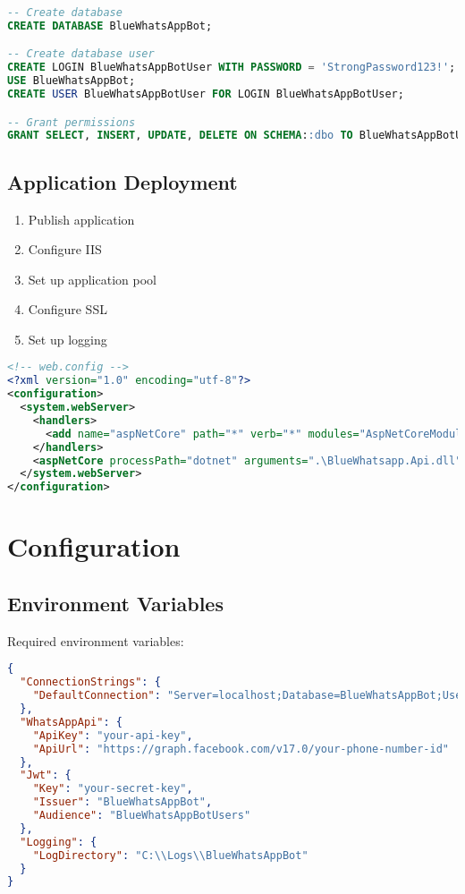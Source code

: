 \begin{lstlisting}[language=sql]
-- Create database
CREATE DATABASE BlueWhatsAppBot;

-- Create database user
CREATE LOGIN BlueWhatsAppBotUser WITH PASSWORD = 'StrongPassword123!';
USE BlueWhatsAppBot;
CREATE USER BlueWhatsAppBotUser FOR LOGIN BlueWhatsAppBotUser;

-- Grant permissions
GRANT SELECT, INSERT, UPDATE, DELETE ON SCHEMA::dbo TO BlueWhatsAppBotUser;
\end{lstlisting}

\subsection{Application Deployment}
\begin{enumerate}
    \item Publish application
    \item Configure IIS
    \item Set up application pool
    \item Configure SSL
    \item Set up logging
\end{enumerate}

\begin{lstlisting}[language=xml]
<!-- web.config -->
<?xml version="1.0" encoding="utf-8"?>
<configuration>
  <system.webServer>
    <handlers>
      <add name="aspNetCore" path="*" verb="*" modules="AspNetCoreModuleV2" resourceType="Unspecified" />
    </handlers>
    <aspNetCore processPath="dotnet" arguments=".\BlueWhatsapp.Api.dll" stdoutLogEnabled="true" stdoutLogFile=".\logs\stdout" />
  </system.webServer>
</configuration>
\end{lstlisting}

\section{Configuration}

\subsection{Environment Variables}
Required environment variables:

\begin{lstlisting}[language=json]
{
  "ConnectionStrings": {
    "DefaultConnection": "Server=localhost;Database=BlueWhatsAppBot;User Id=BlueWhatsAppBotUser;Password=StrongPassword123!;"
  },
  "WhatsAppApi": {
    "ApiKey": "your-api-key",
    "ApiUrl": "https://graph.facebook.com/v17.0/your-phone-number-id"
  },
  "Jwt": {
    "Key": "your-secret-key",
    "Issuer": "BlueWhatsAppBot",
    "Audience": "BlueWhatsAppBotUsers"
  },
  "Logging": {
    "LogDirectory": "C:\\Logs\\BlueWhatsAppBot"
  }
}
\end{lstlisting}

